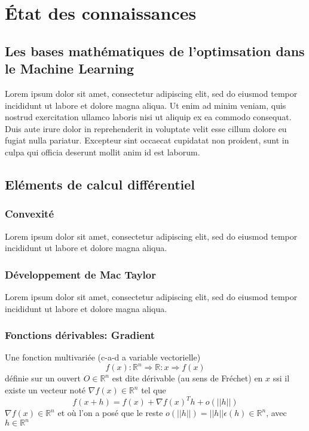 \chapter{État des connaissances}
	\section{}
			
	\section{Les bases mathématiques de l'optimsation dans le Machine Learning}
		Lorem ipsum dolor sit amet, consectetur adipiscing elit, sed do eiusmod tempor incididunt ut labore et dolore magna aliqua. Ut enim ad minim veniam, quis nostrud exercitation ullamco laboris nisi ut aliquip ex ea commodo consequat. Duis aute irure dolor in reprehenderit in voluptate velit esse cillum dolore eu fugiat nulla pariatur. Excepteur sint occaecat cupidatat non proident, sunt in culpa qui officia deserunt mollit anim id est laborum.
		
	\section{Eléments de calcul différentiel}
		
		
	\subsection{Convexité}
		Lorem ipsum dolor sit amet, consectetur adipiscing elit, sed do eiusmod tempor incididunt ut labore et dolore magna aliqua.
		
	\subsection{Développement de Mac Taylor}
			Lorem ipsum dolor sit amet, consectetur adipiscing elit, sed do eiusmod tempor incididunt ut labore et dolore magna aliqua.
		
	\subsection{Fonctions dérivables: Gradient}
		Une fonction multivariée (c-a-d a variable vectorielle)
		$$ f(x)	: \mathbb{R}^n \Longrightarrow \mathbb{R} : x \Longrightarrow f(x)  $$ définie sur un ouvert $O \in \mathbb{R}^n$ est dite dérivable (au sens de Fréchet) en $x$ ssi il existe un vecteur noté $\nabla f(x) \in \mathbb{R}^n$ tel que
		$$ f(x+h) = f(x) + \nabla f(x)^{T}h + o(||h||) $$
		$\nabla f(x) \in \mathbb{R}^n$ et où l’on a posé que le reste $o(||h||) = ||h||\epsilon (h) \in \mathbb{R}^n$, avec
		$h \in \mathbb{R}^n$ 
			
